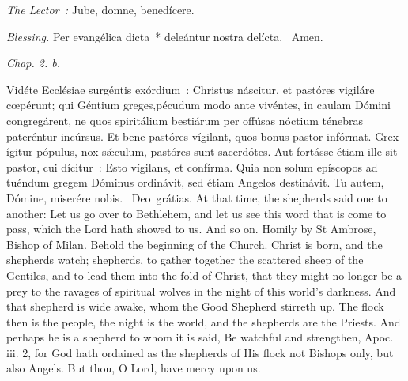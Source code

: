 {{  }

  {
    \bigskip
    \medskip

    \emph{The Lector~:} Jube, domne, benedícere.

    \emph{Blessing.} Per evangélica dicta~* deleántur nostra delícta. \Rbar{}~Amen.
  }

  \bigskip{}
  {


  }

  {
    \hspace{10ex}{Lesson VIII.}\hfill\emph{Chap. 2. b.}\hspace{10ex}

    \begin{parcolumns}[rulebetween,colwidths={1=.45\linewidth}]{2}
    {Vidéte Ecclésiae surgéntis exórdium~: Christus náscitur, et pastóres vigiláre cœpérunt; qui Géntium greges,}{pécudum modo ante vivéntes, in caulam Dómini congregárent, ne quos spiritálium bestiárum per offúsas nóctium ténebras pateréntur incúrsus. Et bene pastóres vígilant, quos bonus pastor infórmat. Grex ígitur pópulus, nox sǽculum, pastóres sunt sacerdótes. Aut fortásse étiam ille sit pastor, cui dícitur~: Esto vígilans, et confírma. Quia non solum epíscopos ad tuéndum gregem Dóminus ordinávit, sed étiam Angelos destinávit.
      Tu autem, Dómine, miserére nobis.
      \Rbar{}~Deo~grátias.}
    {At that time, the shepherds said one to another: Let us go over to Bethlehem, and let us see this word that is come to pass, which the Lord hath showed to us. And so on.}
    {Homily by St Ambrose, Bishop of Milan.}
    {Behold the beginning of the Church. Christ is born, and the shepherds watch; shepherds, to gather together the scattered sheep of the Gentiles, and to lead them into the fold of Christ, that they might no longer be a prey to the ravages of spiritual wolves in the night of this world's darkness. And that shepherd is wide awake, whom the Good Shepherd stirreth up. The flock then is the people, the night is the world, and the shepherds are the Priests. And perhaps he is a shepherd to whom it is said, Be watchful and strengthen, Apoc. iii. 2, for God hath ordained as the shepherds of His flock not Bishops only, but also Angels.
      But thou, O Lord, have mercy upon us.}
    \end{parcolumns}

}}
